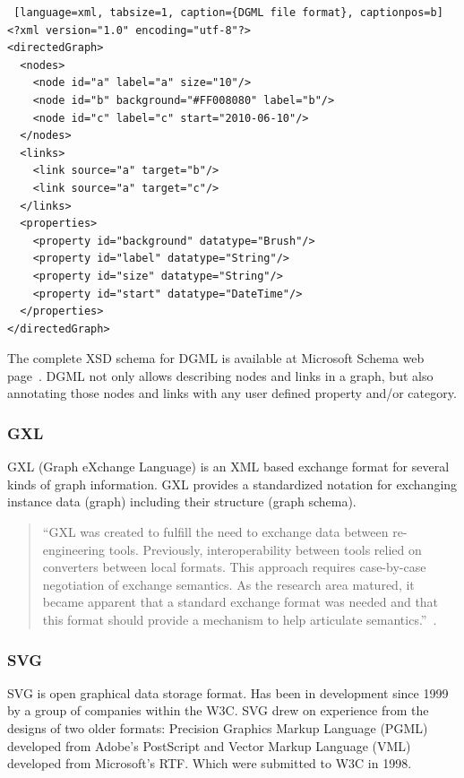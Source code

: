 \begin{center}
\renewcommand{\thelstlisting}{\thesection.\arabic{lstlisting}}
\begin{lstlisting} [language=xml, tabsize=1, caption={DGML file format}, captionpos=b]
<?xml version="1.0" encoding="utf-8"?>
<directedGraph>
  <nodes>
    <node id="a" label="a" size="10"/>
    <node id="b" background="#FF008080" label="b"/>
    <node id="c" label="c" start="2010-06-10"/>
  </nodes>
  <links>
    <link source="a" target="b"/>
    <link source="a" target="c"/>
  </links>
  <properties>
    <property id="background" datatype="Brush"/>
    <property id="label" datatype="String"/>
    <property id="size" datatype="String"/>
    <property id="start" datatype="DateTime"/>
  </properties>
</directedGraph>
\end{lstlisting}
\end{center}

The complete XSD schema for DGML is available at Microsoft Schema web page~\cite{DGML_XSD_URL}.
DGML not only allows describing nodes and links in a graph,
but also annotating those nodes and links with any user defined property and/or category.

\subsubsection{GXL}
GXL (Graph eXchange Language) is an XML based exchange format for several kinds of graph information.
GXL provides a standardized notation for exchanging instance data (graph) including their structure (graph schema).

\begin{quotation}
``GXL was created to fulfill the need to exchange data between re-engineering tools.
Previously, interoperability between tools relied on converters between local formats.
This approach requires case-by-case negotiation of exchange semantics.
As the research area matured, it became apparent that a standard exchange format
was needed and that this format should provide a mechanism to help articulate semantics.''~\cite{GXL}.
\end{quotation}

\subsubsection{SVG}
SVG is open graphical data storage format. Has been in development since 1999 by a group of companies within the W3C.
SVG drew on experience from the designs of two older formats: Precision Graphics Markup Language (PGML) developed from Adobe's PostScript and Vector Markup Language (VML) developed from Microsoft's RTF. Which were submitted to W3C in 1998.


